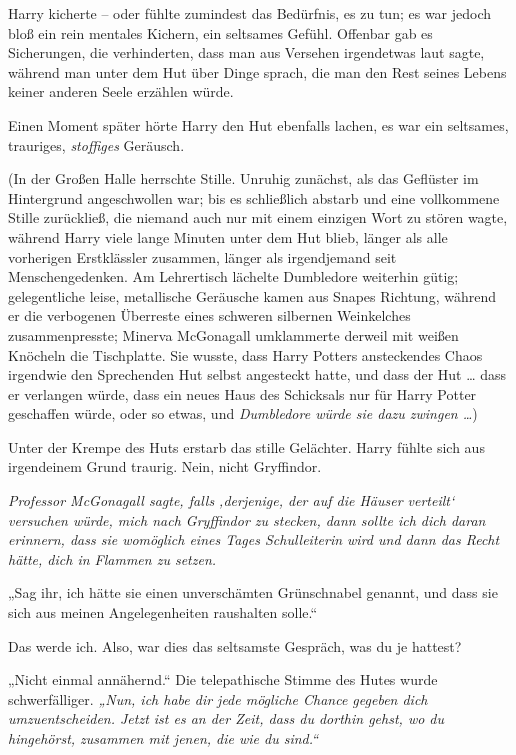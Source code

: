 {Harry kicherte -- oder fühlte zumindest das Bedürfnis, es zu tun; es war jedoch bloß ein rein mentales Kichern, ein seltsames Gefühl. Offenbar gab es Sicherungen, die verhinderten, dass man aus Versehen irgendetwas laut sagte, während man unter dem Hut über Dinge sprach, die man den Rest seines Lebens keiner anderen Seele erzählen würde.

Einen Moment später hörte Harry den Hut ebenfalls lachen, es war ein seltsames, trauriges, \emph{stoffiges} Geräusch.

(In der Großen Halle herrschte Stille. Unruhig zunächst, als das Geflüster im Hintergrund angeschwollen war; bis es schließlich abstarb und eine vollkommene Stille zurückließ, die niemand auch nur mit einem einzigen Wort zu stören wagte, während Harry viele lange Minuten unter dem Hut blieb, länger als alle vorherigen Erstklässler zusammen, länger als irgendjemand seit Menschengedenken. Am Lehrertisch lächelte Dumbledore weiterhin gütig; gelegentliche leise, metallische Geräusche kamen aus Snapes Richtung, während er die verbogenen Überreste eines schweren silbernen Weinkelches zusammenpresste; Minerva McGonagall umklammerte derweil mit weißen Knöcheln die Tischplatte. Sie wusste, dass Harry Potters ansteckendes Chaos irgendwie den Sprechenden Hut selbst angesteckt hatte, und dass der Hut … dass er verlangen würde, dass ein neues Haus des Schicksals nur für Harry Potter geschaffen würde, oder so etwas, und \emph{Dumbledore würde sie dazu zwingen …})

Unter der Krempe des Huts erstarb das stille Gelächter. Harry fühlte sich aus irgendeinem Grund traurig. Nein, nicht Gryffindor.

\emph{Professor McGonagall sagte, falls ‚derjenige, der auf die Häuser verteilt` versuchen würde, mich nach Gryffindor zu stecken, dann sollte ich dich daran erinnern, dass sie womöglich eines Tages Schulleiterin wird und dann das Recht hätte, dich in Flammen zu setzen.}

„Sag ihr, ich hätte sie einen unverschämten Grünschnabel genannt, und dass sie sich aus meinen Angelegenheiten raushalten solle.“

Das werde ich. Also, war dies das seltsamste Gespräch, was du je hattest?

„Nicht einmal annähernd.“ Die telepathische Stimme des Hutes wurde schwerfälliger. \emph{„Nun, ich habe dir jede mögliche Chance gegeben dich umzuentscheiden. Jetzt ist es an der Zeit, dass du dorthin gehst, wo du hingehörst, zusammen mit jenen, die wie du sind.“}

}
